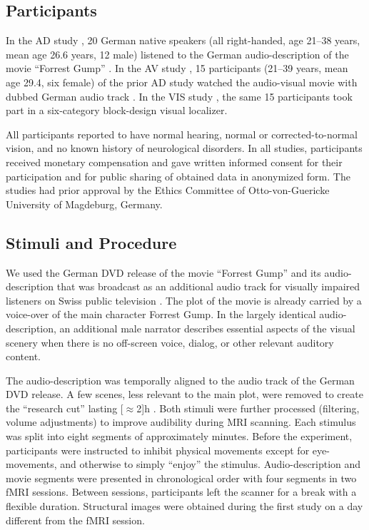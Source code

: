 \documentclass[english]{article}
\begin{document}
\subsection{Participants}
In the AD study \citep{hanke2014audiomovie}, 20 German native speakers (all
right-handed, age 21–38 years, mean age 26.6 years, 12 male) listened to the
German audio-description \citep{ForrestGumpGermanAD} of the movie ``Forrest
Gump'' \citep{ForrestGumpMovie}.
In the AV study \citep{hanke2016simultaneous}, 15 participants (21–39 years,
mean age 29.4, six female) of the prior AD study watched the audio-visual movie
with dubbed German audio track \citep{ForrestGumpDVD}.
In the VIS study \citep{sengupta2016extension}, the same 15 participants took
part in a six-category block-design visual localizer.

All participants reported to have normal hearing, normal or corrected-to-normal
vision, and no known history of neurological disorders.
In all studies, participants received monetary compensation and gave written
informed consent for their participation and for public sharing of obtained data
in anonymized form. The studies had prior approval by the Ethics Committee of
Otto-von-Guericke University of Magdeburg, Germany.


\subsection{Stimuli and Procedure}

We used the German DVD release \citep{ForrestGumpDVD} of the movie ``Forrest
Gump'' \citep{ForrestGumpMovie} and its audio-description that was broadcast as
an additional audio track for visually impaired listeners on Swiss public
television \citep{ForrestGumpGermanAD}.
The plot of the movie is already carried by a voice-over of the main character
Forrest Gump.
In the largely identical audio-description, an additional male narrator
describes essential aspects of the visual scenery when there is no off-screen
voice, dialog, or other relevant auditory content.

The audio-description was temporally aligned to the audio track of the German
DVD release. A few scenes, less relevant to the main plot, were removed to create
the ``research cut'' lasting \unit[$\approx$2]{h} \citep{hanke2014audiomovie,
hanke2016simultaneous}.
Both stimuli were further processed (filtering, volume adjustments) to improve
audibility during MRI scanning.
Each stimulus was split into eight segments of approximately \unit[15]{minutes}.
Before the experiment, participants were instructed to inhibit physical
movements except for eye-movements, and otherwise to simply ``enjoy'' the
stimulus.
Audio-description and movie segments were presented in chronological order with
four segments in two fMRI sessions. Between sessions, participants left the
scanner for a break with a flexible duration. Structural images were obtained
during the first study on a day different from the fMRI session.
\end{document}

